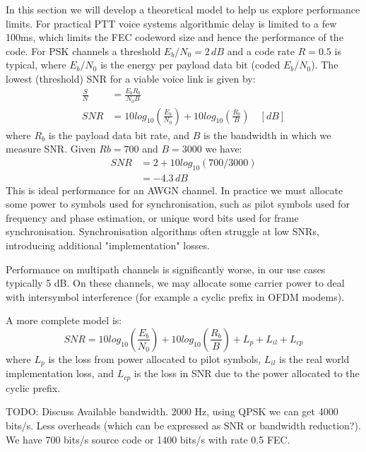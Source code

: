 \documentclass{article}
\begin{document}
In this section we will develop a theoretical model to help us explore performance limits.  For practical PTT voice systems algorithmic delay is limited to a few 100ms, which limits the FEC codeword size and hence the performance of the code.  For PSK channels a threshold $E_b/N_0=2 \, \si{dB}$ and a code rate $R=0.5$ is typical, where $E_b/N_0$ is the energy per payload data bit (coded $E_b/N_0$).  The lowest (threshold) SNR for a viable voice link is given by:
\begin{equation}
\label{eq:snr}
\begin{split}
\frac{S}{N} &= \frac{E_bR_b}{N_0B} \\
SNR &= 10log_{10}\left(\frac{E_b}{N_0}\right) + 10log_{10}\left(\frac{R_b}{B}\right) \quad [\si{dB}]
\end{split}
\end{equation}
where $R_b$ is the payload data bit rate, and $B$ is the bandwidth in which we measure SNR.  Given $Rb=700$ and $B=3000$ we have:
\begin{equation}
\begin{split}
SNR &= 2 + 10log_{10}(700/3000) \\
    &= -4.3 \, \si{dB}
\end{split}
\end{equation}
This is ideal performance for an AWGN channel.  In practice we must allocate some power to symbols used for synchronisation, such as pilot symbols used for frequency and phase estimation, or unique word bits used for frame synchronisation.  Synchronisation algorithms often struggle at low SNRs, introducing additional "implementation" losses.

Performance on multipath channels is significantly worse, in our use cases typically 5 dB.  On these channels, we may allocate some carrier power to deal with intersymbol interference (for example a cyclic prefix in OFDM modems).

A more complete model is:
\begin{equation}
\label{eq:snr_all}
SNR = 10log_{10}\left(\frac{E_b}{N_0}\right) + 10log_{10}\left(\frac{R_b}{B}\right) + L_p + L_{il} + L_{cp}
\end{equation}
where $L_p$ is the loss from power allocated to pilot symbols, $L_{il}$ is the real world implementation loss, and $L_{cp}$ is the loss in SNR due to the power allocated to the cyclic prefix.

TODO: Discuss Available bandwidth. 2000 Hz, using QPSK we can get 4000 bits/s.  Less overheads (which can be expressed as SNR or bandwidth reduction?).  We have 700 bits/s source code or 1400 bits/s with rate 0.5 FEC.
\end{document}
